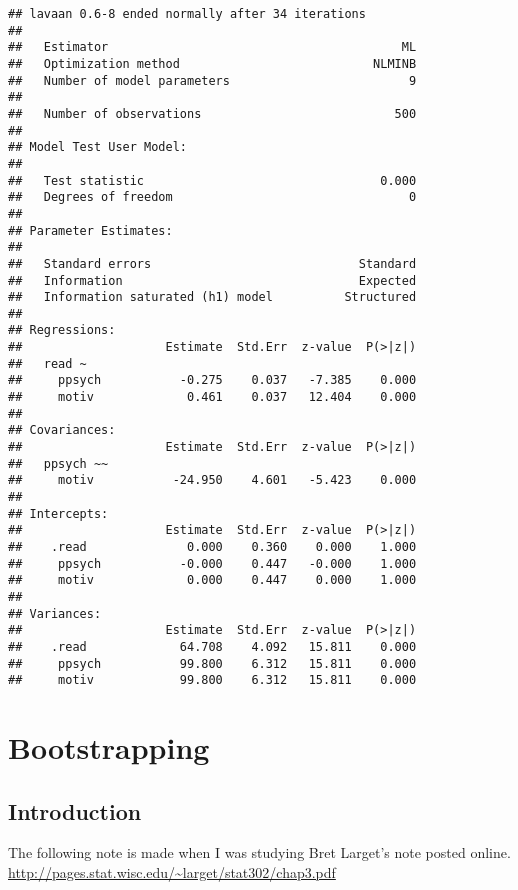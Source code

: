 \documentclass[]{book}
\begin{document}
\begin{verbatim}
## lavaan 0.6-8 ended normally after 34 iterations
## 
##   Estimator                                         ML
##   Optimization method                           NLMINB
##   Number of model parameters                         9
##                                                       
##   Number of observations                           500
##                                                       
## Model Test User Model:
##                                                       
##   Test statistic                                 0.000
##   Degrees of freedom                                 0
## 
## Parameter Estimates:
## 
##   Standard errors                             Standard
##   Information                                 Expected
##   Information saturated (h1) model          Structured
## 
## Regressions:
##                    Estimate  Std.Err  z-value  P(>|z|)
##   read ~                                              
##     ppsych           -0.275    0.037   -7.385    0.000
##     motiv             0.461    0.037   12.404    0.000
## 
## Covariances:
##                    Estimate  Std.Err  z-value  P(>|z|)
##   ppsych ~~                                           
##     motiv           -24.950    4.601   -5.423    0.000
## 
## Intercepts:
##                    Estimate  Std.Err  z-value  P(>|z|)
##    .read              0.000    0.360    0.000    1.000
##     ppsych           -0.000    0.447   -0.000    1.000
##     motiv             0.000    0.447    0.000    1.000
## 
## Variances:
##                    Estimate  Std.Err  z-value  P(>|z|)
##    .read             64.708    4.092   15.811    0.000
##     ppsych           99.800    6.312   15.811    0.000
##     motiv            99.800    6.312   15.811    0.000
\end{verbatim}

\hypertarget{bootstrapping}{%
\chapter{Bootstrapping}\label{bootstrapping}}

\hypertarget{introduction}{%
\section{Introduction}\label{introduction}}

The following note is made when I was studying Bret Larget's note posted online.
\url{http://pages.stat.wisc.edu/~larget/stat302/chap3.pdf}
\end{document}
